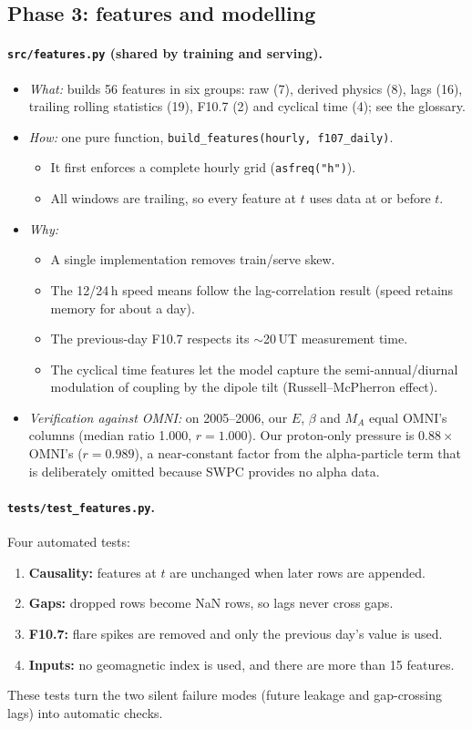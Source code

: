 \documentclass[11pt,a4paper]{article}
\newcommand{\code}[1]{\texttt{#1}}
\begin{document}
\subsection{Phase 3: features and modelling}
\paragraph{\code{src/features.py} (shared by training and serving).}
\begin{itemize}
\item \textit{What:} builds 56 features in six groups: raw (7), derived physics (8), lags (16), trailing rolling
statistics (19), F10.7 (2) and cyclical time (4); see the glossary.
\item \textit{How:} one pure function, \code{build\_features(hourly, f107\_daily)}.
  \begin{itemize}
  \item It first enforces a complete hourly grid (\code{asfreq("h")}).
  \item All windows are trailing, so every feature at $t$ uses data at or before $t$.
  \end{itemize}
\item \textit{Why:}
  \begin{itemize}
  \item A single implementation removes train/serve skew.
  \item The 12/24\,h speed means follow the lag-correlation result (speed retains memory for about a day).
  \item The previous-day F10.7 respects its $\sim$20\,UT measurement time.
  \item The cyclical time features let the model capture the semi-annual/diurnal modulation of coupling by
  the dipole tilt (Russell--McPherron effect).
  \end{itemize}
\item \textit{Verification against OMNI:} on 2005--2006, our $E$, $\beta$ and $M_A$ equal OMNI's columns
(median ratio 1.000, $r=1.000$). Our proton-only pressure is $0.88\times$ OMNI's ($r=0.989$), a near-constant
factor from the alpha-particle term that is deliberately omitted because SWPC provides no alpha data.
\end{itemize}

\paragraph{\code{tests/test\_features.py}.} Four automated tests:
\begin{enumerate}
\item \textbf{Causality:} features at $t$ are unchanged when later rows are appended.
\item \textbf{Gaps:} dropped rows become NaN rows, so lags never cross gaps.
\item \textbf{F10.7:} flare spikes are removed and only the previous day's value is used.
\item \textbf{Inputs:} no geomagnetic index is used, and there are more than 15 features.
\end{enumerate}
These tests turn the two silent failure modes (future leakage and gap-crossing lags) into automatic checks.
\end{document}
